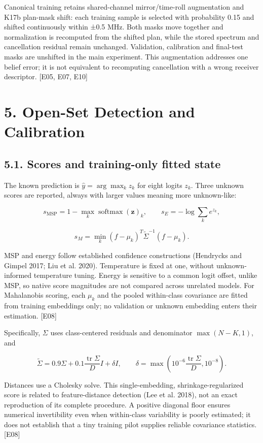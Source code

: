 \documentclass[
  10pt,
]{article}
\begin{document}
Canonical training retains shared-channel mirror/time-roll augmentation
and K17b plan-mask shift: each training sample is selected with
probability 0.15 and shifted continuously within ±0.5 MHz. Both masks
move together and normalization is recomputed from the shifted plan,
while the stored spectrum and cancellation residual remain unchanged.
Validation, calibration and final-test masks are unshifted in the main
experiment. This augmentation addresses one belief error; it is not
equivalent to recomputing cancellation with a wrong receiver descriptor.
{[}E05, E07, E10{]}

\section{5. Open-Set Detection and
Calibration}\label{open-set-detection-and-calibration}

\subsection{5.1. Scores and training-only fitted
state}\label{scores-and-training-only-fitted-state}

The known prediction is \(\widehat y=\arg\max_k z_k\) for eight logits
\(z_k\). Three unknown scores are reported, always with larger values
meaning more unknown-like:

\[s_{\mathrm{MSP}}=1-\max_k\operatorname{softmax}(\mathbf z)_k,\qquad s_E=-\log\sum_k e^{z_k},\]

\[s_M=\min_k(f-\mu_k)^T\widetilde\Sigma^{-1}(f-\mu_k).\]

MSP and energy follow established confidence constructions (Hendrycks
and Gimpel 2017; Liu et al. 2020). Temperature is fixed at one, without
unknown-informed temperature tuning. Energy is sensitive to a common
logit offset, unlike MSP, so native score magnitudes are not compared
across unrelated models. For Mahalanobis scoring, each \(\mu_k\) and the
pooled within-class covariance are fitted from training embeddings only;
no validation or unknown embedding enters their estimation. {[}E08{]}

Specifically, \(\Sigma\) uses class-centered residuals and denominator
\(\max(N-K,1)\), and

\[\widetilde\Sigma=0.9\Sigma+0.1\frac{\operatorname{tr}\Sigma}{D}I+\delta I,\qquad \delta=\max\!\left(10^{-6}\frac{\operatorname{tr}\Sigma}{D},10^{-8}\right).\]

Distances use a Cholesky solve. This single-embedding,
shrinkage-regularized score is related to feature-distance detection
(Lee et al. 2018), not an exact reproduction of its complete procedure.
A positive diagonal floor ensures numerical invertibility even when
within-class variability is poorly estimated; it does not establish that
a tiny training pilot supplies reliable covariance statistics. {[}E08{]}
\end{document}

